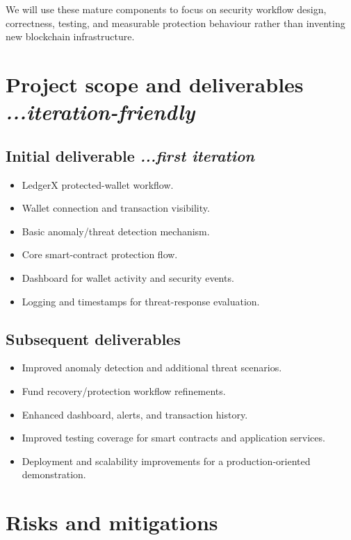 \documentclass[10pt,a4paper]{article}
\begin{document}
We will use these mature components to focus on security workflow design, correctness, testing, and measurable protection behaviour rather than inventing new blockchain infrastructure.

\section{Project scope and deliverables \hfill \normalfont\itshape ...iteration-friendly}

\subsection{Initial deliverable \hfill \normalfont\itshape ...first iteration}

\begin{itemize}
    \item LedgerX protected-wallet workflow.
    \item Wallet connection and transaction visibility.
    \item Basic anomaly/threat detection mechanism.
    \item Core smart-contract protection flow.
    \item Dashboard for wallet activity and security events.
    \item Logging and timestamps for threat-response evaluation.
\end{itemize}

\subsection{Subsequent deliverables}

\begin{itemize}
    \item Improved anomaly detection and additional threat scenarios.
    \item Fund recovery/protection workflow refinements.
    \item Enhanced dashboard, alerts, and transaction history.
    \item Improved testing coverage for smart contracts and application services.
    \item Deployment and scalability improvements for a production-oriented demonstration.
\end{itemize}

\section{Risks and mitigations}
\end{document}
